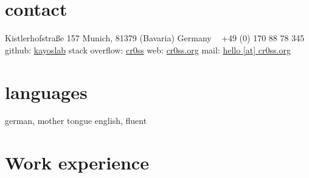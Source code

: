 \documentclass[]{friggeri-cv} %
\begin{document}


\begin{aside} %
	\section{contact}
	Kistlerhofstraße 157
	Munich, 81379 
	(Bavaria) Germany
	~
	+49 (0) 170 88 78 345
	~
	github: \href{https://github.com/kayoslab}{kayoslab}
	stack overflow: \href{https://stackoverflow.com/story/cr0ss}{cr0ss}
	web: \href{https://cr0ss.org/}{cr0ss.org}
	mail: \href{mailto:hello@cr0ss.org}{hello [at] cr0ss.org}
	~
	\section{languages}
	german, mother tongue
	english, fluent
\end{aside}


\section{Work experience}

	
\end{document}
